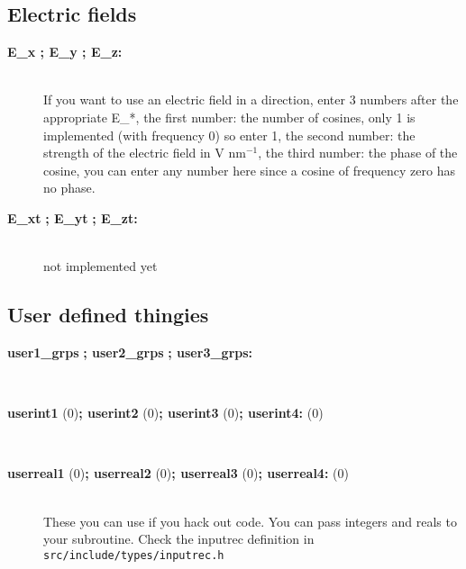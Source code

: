 \subsection{Electric fields}
\begin{description}
\item[{\bf E\_x ; E\_y ; E\_z:}]\mbox{}\\
If you want to use an electric field in a direction, enter 3 numbers
after the appropriate E\_*, the first number: the number of cosines,
only 1 is implemented (with frequency 0) so enter 1,
the second number: the strength of the electric field in
V nm$^{-1}$,
the third number: the phase of the cosine, you can enter any number here
since a cosine of frequency zero has no phase.
\item[{\bf E\_xt }{\bf  ;  E\_yt }{\bf  ;  E\_zt: }]\mbox{}\\
not implemented yet
\end{description}

\subsection{User defined thingies}
\begin{description}
\item[{\bf user1\_grps }{\bf  ; user2\_grps }{\bf  ; user3\_grps: }]\mbox{}\\
\item[{\bf userint1 }(0){\bf  ; userint2 }(0){\bf  ; userint3 }(0){\bf  ; userint4: }(0)]\mbox{}\\
\item[{\bf userreal1 }(0){\bf  ; userreal2 }(0){\bf  ; userreal3 }(0){\bf  ; userreal4: }(0)]\mbox{}\\
These you can use if you hack out code. You can pass integers and
reals to your subroutine. Check the inputrec definition in
{\tt src/include/types/inputrec.h}
\end{description}

